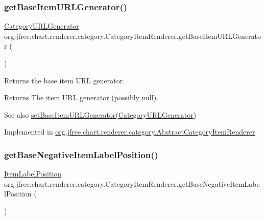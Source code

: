 \subsubsection{\texorpdfstring{get\+Base\+Item\+U\+R\+L\+Generator()}{getBaseItemURLGenerator()}}
{\footnotesize\ttfamily \mbox{\hyperlink{interfaceorg_1_1jfree_1_1chart_1_1urls_1_1_category_u_r_l_generator}{Category\+U\+R\+L\+Generator}} org.\+jfree.\+chart.\+renderer.\+category.\+Category\+Item\+Renderer.\+get\+Base\+Item\+U\+R\+L\+Generator (\begin{DoxyParamCaption}{ }\end{DoxyParamCaption})}

Returns the base item U\+RL generator.

\begin{DoxyReturn}{Returns}
The item U\+RL generator (possibly {\ttfamily null}).
\end{DoxyReturn}
\begin{DoxySeeAlso}{See also}
\mbox{\hyperlink{interfaceorg_1_1jfree_1_1chart_1_1renderer_1_1category_1_1_category_item_renderer_a4400119df0df9fa629f6b0b630da4bb5}{set\+Base\+Item\+U\+R\+L\+Generator(\+Category\+U\+R\+L\+Generator)}} 
\end{DoxySeeAlso}


Implemented in \mbox{\hyperlink{classorg_1_1jfree_1_1chart_1_1renderer_1_1category_1_1_abstract_category_item_renderer_ac9003c1ec9ad1cc03e1beecca61e6bf1}{org.\+jfree.\+chart.\+renderer.\+category.\+Abstract\+Category\+Item\+Renderer}}.

\mbox{\label{interfaceorg_1_1jfree_1_1chart_1_1renderer_1_1category_1_1_category_item_renderer_a07449f382743d7ef7196b59f592c2b80}} 
\subsubsection{\texorpdfstring{get\+Base\+Negative\+Item\+Label\+Position()}{getBaseNegativeItemLabelPosition()}}
{\footnotesize\ttfamily \mbox{\hyperlink{classorg_1_1jfree_1_1chart_1_1labels_1_1_item_label_position}{Item\+Label\+Position}} org.\+jfree.\+chart.\+renderer.\+category.\+Category\+Item\+Renderer.\+get\+Base\+Negative\+Item\+Label\+Position (\begin{DoxyParamCaption}{ }\end{DoxyParamCaption})}

